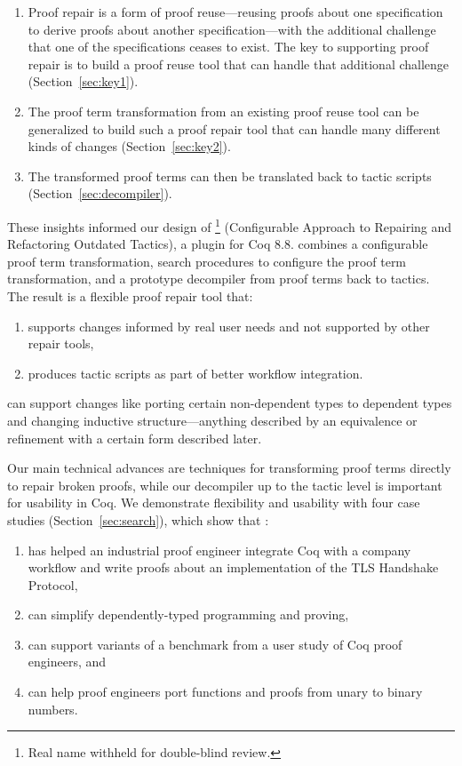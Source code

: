 \begin{enumerate}
\item Proof repair is a form of proof reuse---reusing proofs about one specification to derive proofs about another specification---with 
the additional challenge that one of the specifications ceases to exist.
The key to supporting proof repair is to build a proof reuse
tool that can handle that additional challenge (Section~\ref{sec:key1}). 
\item The proof term transformation from an existing proof reuse tool can be generalized
to build such a proof repair tool that can handle many different kinds of changes (Section~\ref{sec:key2}).
\item The transformed proof terms can then be translated back to tactic scripts (Section~\ref{sec:decompiler}).
\end{enumerate}

These insights informed our design of 
\toolname\footnote{Real name withheld for double-blind review.} (Configurable Approach to Repairing and Refactoring Outdated Tactics), a plugin for Coq 8.8.
\toolname combines a configurable proof term transformation,
search procedures to configure the proof term transformation,
and a prototype decompiler from proof terms back to tactics.
The result is a flexible proof repair tool that: 

\begin{enumerate}
\item supports changes informed by real user needs and not supported by other repair tools,
\item produces tactic scripts as part of better workflow integration.
\end{enumerate}
\toolname can support changes like porting certain non-dependent types to dependent types
and changing inductive structure---anything described by an equivalence or refinement with a certain form described later.

Our main technical advances are techniques for transforming proof terms directly to repair broken proofs, while our decompiler up to the tactic level is important for usability in Coq.
We demonstrate flexibility and usability with four case studies (Section~\ref{sec:search}), which show that \toolname:

\begin{enumerate}
\item has helped an industrial proof engineer integrate Coq with a company workflow and write proofs about an implementation of the TLS Handshake Protocol,
\item can simplify dependently-typed programming and proving,
\item can support variants of a benchmark from a user study of Coq proof engineers, and
\item can help proof engineers port functions and proofs from unary to binary numbers.
\end{enumerate}

